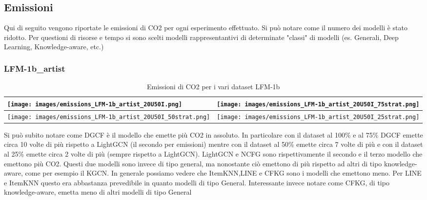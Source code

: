 \subsection{Emissioni}

Qui di seguito vengono riportate le emissioni di CO2 per ogni esperimento effettuato.
Si può notare come il numero dei modelli è stato ridotto. Per questioni di risorse e tempo si sono scelti modelli rappresentantivi di determinate "classi" di modelli (es. Generali, Deep Learning, Knowledge-aware, etc.) 


\subsubsection{LFM-1b\_artist}
\begin{table}[H]
    \centering
    \footnotesize
    \setlength\tabcolsep{0pt}
    \begin{tabularx}{\textwidth}{|X|X|}
        \hline
        \texttt{[image: images/emissions\_LFM-1b\_artist\_20U50I.png]} &
        \texttt{[image: images/emissions\_LFM-1b\_artist\_20U50I\_75strat.png]} \\
        \hline
        \texttt{[image: images/emissions\_LFM-1b\_artist\_20U50I\_50strat.png]} &
        \texttt{[image: images/emissions\_LFM-1b\_artist\_20U50I\_25strat.png]} \\
        \hline
    \end{tabularx}
    \caption{Emissioni di CO2 per i vari dataset LFM-1b}
    \label{tab:emissions_info}
\end{table}

\noindent Si può subito notare come DGCF è il modello che emette più CO2 in assoluto.
In particolare con il dataset al 100\% e al 75\% DGCF emette circa 10 volte di più rispetto a LightGCN (il secondo per emissioni)
mentre con il dataset al 50\% emette circa 7 volte di più e con il dataset al 25\% emette circa 2 volte di più (sempre rispetto a LightGCN).
LightGCN e NCFG sono rispettivamente il secondo e il terzo modello che emettono più CO2.
Questi due modelli sono invece di tipo general, ma nonostante ciò emettono di più rispetto ad altri di tipo knowledge-aware, come per esempio il KGCN.
In generale possiamo vedere che ItemKNN,LINE e CFKG sono i modelli che emettono meno.
Per LINE e ItemKNN questo era abbastanza prevedibile in quanto modelli di tipo General. Interessante invece notare come CFKG, di tipo knowledge-aware, emetta meno di altri modelli di tipo General


